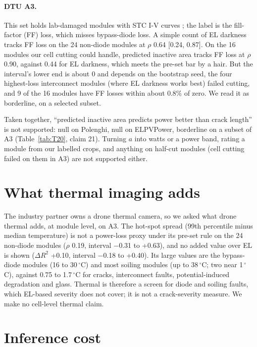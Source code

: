 \paragraph{DTU A3.} This set holds lab-damaged modules with STC I-V curves \citep{delpradosantamaria2025drone}; the label is the
fill-factor (FF) loss, which misses bypass-diode loss. A simple count of EL darkness tracks FF loss on the 24 non-diode modules at
$\rho$ 0.64 [0.24, 0.87]. On the 16 modules our cell cutting could handle, predicted inactive area tracks FF loss at $\rho$ 0.90,
against 0.44 for EL darkness, which meets the pre-set bar by a hair. But the interval's lower end is about 0 and depends on the
bootstrap seed, the four highest-loss interconnect modules (where EL darkness works best) failed cutting, and 9 of the 16 modules have
FF losses within about 0.8\% of zero. We read it as borderline, on a selected subset.

Taken together, ``predicted inactive area predicts power better than crack length'' is not supported: null on Polenghi, null on
ELPVPower, borderline on a subset of A3 (Table~\ref{tab:T20}, claim 21). Turning $a$ into watts or a power band, rating a module from
our labelled crops, and anything on half-cut modules (cell cutting failed on them in A3) are not supported either.

\section{What thermal imaging adds}
\label{sec:deploy-thermal}

The industry partner owns a drone thermal camera, so we asked what drone thermal adds, at module level, on A3. The hot-spot spread (99th
percentile minus median temperature) is not a power-loss proxy under its pre-set rule on the 24 non-diode modules ($\rho$ 0.19,
interval $-$0.31 to +0.63), and no added value over EL is shown ($\Delta R^2$ +0.10, interval $-$0.18 to +0.40). Its large values are
the bypass-diode modules (16 to 30\,$^\circ$C) and most soiling modules (up to 38\,$^\circ$C; two near 1\,$^\circ$C), against 0.75 to
1.7\,$^\circ$C for cracks, interconnect faults, potential-induced degradation and glass. Thermal is therefore a screen for diode and
soiling faults, which EL-based severity does not cover; it is not a crack-severity measure. We make no cell-level thermal claim.

\section{Inference cost}
\label{sec:deploy-cost}

